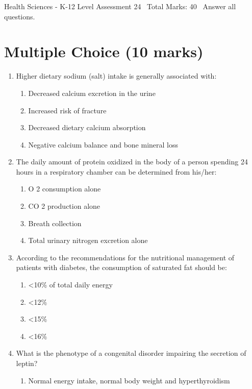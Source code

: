 \documentclass[12pt]{article}
\begin{document}
\begin{center}
Health Sciences - K-12 Level Assessment 24 \
Total Marks: 40 \
Answer all questions.
\end{center}

\section*{Multiple Choice (10 marks)}
\begin{enumerate}[label=\arabic*.]
\item Higher dietary sodium (salt) intake is generally associated with:
\begin{enumerate}[label=(\alph*)]
    \item Decreased calcium excretion in the urine
    \item Increased risk of fracture
    \item Decreased dietary calcium absorption
    \item Negative calcium balance and bone mineral loss
\end{enumerate}
\item The daily amount of protein oxidized in the body of a person spending 24 hours in a respiratory chamber can be determined from his/her:
\begin{enumerate}[label=(\alph*)]
    \item O 2 consumption alone
    \item CO 2 production alone
    \item Breath collection
    \item Total urinary nitrogen excretion alone
\end{enumerate}
\item According to the recommendations for the nutritional management of patients with diabetes, the consumption of saturated fat should be:
\begin{enumerate}[label=(\alph*)]
    \item \textless{}10\% of total daily energy
    \item \textless{}12\%
    \item \textless{}15\%
    \item \textless{}16\%
\end{enumerate}
\item What is the phenotype of a congenital disorder impairing the secretion of leptin?
\begin{enumerate}[label=(\alph*)]
    \item Normal energy intake, normal body weight and hyperthyroidism

\end{enumerate}
\end{enumerate}
\end{document}
